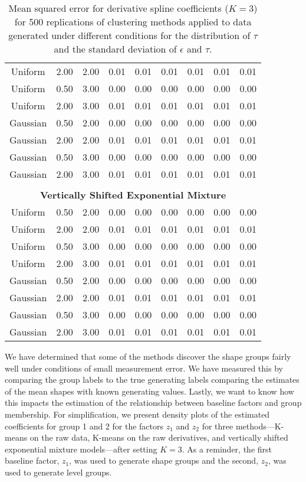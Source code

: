 \begin{table}[ht]
\begin{center}
\begin{tabular}{ccc|cccccc}
  Uniform & 2.00 & 2.00 & 0.01 & 0.01 & 0.01 & 0.01 & 0.01 & 0.01 \\ 
  Uniform & 0.50 & 3.00 & 0.00 & 0.00 & 0.00 & 0.00 & 0.00 & 0.00 \\ 
  Uniform & 2.00 & 3.00 & 0.01 & 0.01 & 0.01 & 0.01 & 0.01 & 0.01 \\ 
  Gaussian & 0.50 & 2.00 & 0.00 & 0.00 & 0.00 & 0.00 & 0.00 & 0.00 \\ 
  Gaussian & 2.00 & 2.00 & 0.01 & 0.01 & 0.01 & 0.01 & 0.01 & 0.01 \\ 
  Gaussian & 0.50 & 3.00 & 0.00 & 0.00 & 0.00 & 0.00 & 0.00 & 0.00 \\ 
  Gaussian & 2.00 & 3.00 & 0.01 & 0.01 & 0.01 & 0.01 & 0.01 & 0.01 \\ 
   \\ \multicolumn{9}{c}{\textbf{Vertically Shifted Exponential Mixture}}\\Uniform & 0.50 & 2.00 & 0.00 & 0.00 & 0.00 & 0.00 & 0.00 & 0.00 \\ 
  Uniform & 2.00 & 2.00 & 0.01 & 0.01 & 0.01 & 0.01 & 0.01 & 0.01 \\ 
  Uniform & 0.50 & 3.00 & 0.00 & 0.00 & 0.00 & 0.00 & 0.00 & 0.00 \\ 
  Uniform & 2.00 & 3.00 & 0.01 & 0.01 & 0.01 & 0.01 & 0.01 & 0.01 \\ 
  Gaussian & 0.50 & 2.00 & 0.00 & 0.00 & 0.00 & 0.00 & 0.00 & 0.00 \\ 
  Gaussian & 2.00 & 2.00 & 0.01 & 0.01 & 0.01 & 0.01 & 0.01 & 0.01 \\ 
  Gaussian & 0.50 & 3.00 & 0.00 & 0.00 & 0.00 & 0.00 & 0.00 & 0.00 \\ 
  Gaussian & 2.00 & 3.00 & 0.01 & 0.01 & 0.01 & 0.01 & 0.01 & 0.01 \\ 
   \hline\end{tabular}
\caption{Mean squared error for derivative spline coefficients ($K=3$) for 500 replications of clustering methods applied to data generated under different conditions for the distribution of $\tau$ and the standard deviation of $\epsilon$ and $\tau$.}
\label{tab:mse3}
\end{center}
\end{table}

We have determined that some of the methods discover the shape groups fairly well under conditions of small measurement error. We have measured this by comparing the group labels to the true generating labels comparing the estimates of the mean shapes with known generating values. Lastly, we want to know how this impacts the estimation of the relationship between baseline factors and group membership. For simplification, we present density plots of the estimated coefficients for group 1 and 2 for the factors $z_{1}$ and $z_{2}$ for three methods---K-means on the raw data, K-means on the raw derivatives, and vertically shifted exponential mixture models---after setting $K=3$. As a reminder, the first baseline factor, $z_{1}$, was used to generate shape groups and the second, $z_{2}$, was used to generate level groups. \\

